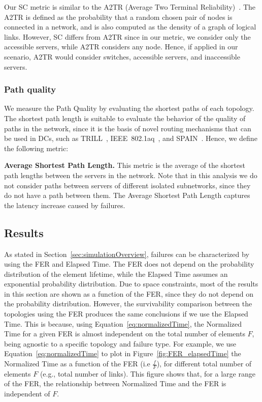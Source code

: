 Our SC metric is similar to the A2TR (Average Two Terminal Reliability)~\cite{neumayer2010Network}. The A2TR is defined as the probability that a random chosen pair of nodes is connected in a network, and is also computed as the density of a graph of logical links. However, SC differs from A2TR since in our metric, we consider only the accessible servers, while A2TR considers any node. Hence, if applied in our scenario, A2TR would consider switches, accessible servers, and inaccessible servers.
\subsubsection{Path quality}
\label{sec:pathQuality}
We measure the Path Quality by evaluating the shortest paths of each topology.
The shortest path length is suitable to evaluate the behavior of the quality of paths in the network, since it is the basis of novel routing mechanisms that can be used in DCs, such as TRILL~\cite{rfc5556}, IEEE~802.1aq~\cite{spb}, and SPAIN~\cite{mudigonda2010spain}.
Hence, we define the following metric:

\textbf{Average Shortest Path Length.} This metric is the average of the shortest path lengths between the servers in the network. Note that in this analysis we do not consider paths between servers of different isolated subnetworks, since they do not have a path between them. The Average Shortest Path Length captures the latency increase caused by failures.
\subsection{Results}
\label{sec:survivalTimeResults} 

As stated in Section~\ref{sec:simulationOverview}, failures can be characterized by using the FER and Elapsed Time. The FER does not depend on the probability distribution of the element lifetime, while the Elapsed Time assumes an exponential probability distribution. Due to space constraints, most of the results in this section are shown as a function of the FER, since they do not depend on the probability distribution. However, the survivability comparison between the topologies using the FER produces the same conclusions if we use the Elapsed Time. This is because, using Equation~\ref{eq:normalizedTime}, the Normalized Time for a given FER is almost independent on the total number of elements $F$, being agnostic to a specific topology and failure type.
For example, we use Equation~\ref{eq:normalizedTime} to plot in Figure~\ref{fig:FER_elapsedTime} the Normalized Time as a function of the FER (i.e $\frac{f}{F}$), for different total number of elements $F$ (e.g., total number of links). This figure shows that, for a large range of the FER, the relationship between Normalized Time and the FER is independent of $F$.

